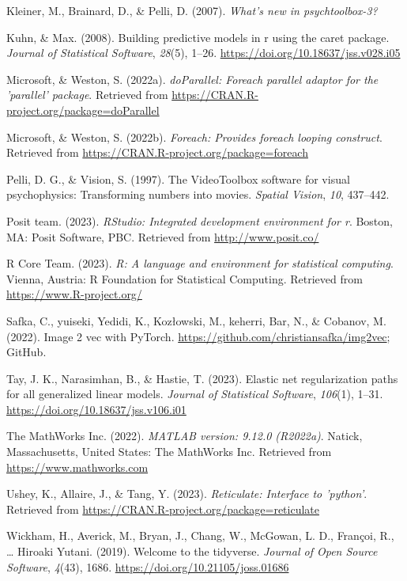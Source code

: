 \documentclass[
  man]{apa6}
\newlength{\cslhangindent}
\newlength{\cslentryspacingunit} %
\newenvironment{CSLReferences}[2] %
 {%
  \setlength{\parindent}{0pt}
  \ifodd #1
  \let\oldpar\par
  \def\par{\hangindent=\cslhangindent\oldpar}
  \fi
  \setlength{\parskip}{#2\cslentryspacingunit}
 }%
 {}
\begin{document}
\begin{CSLReferences}{1}{0}
\leavevmode{}%
Kleiner, M., Brainard, D., \& Pelli, D. (2007). \emph{What's new in psychtoolbox-3?}

\leavevmode{}%
Kuhn, \& Max. (2008). Building predictive models in r using the caret package. \emph{Journal of Statistical Software}, \emph{28}(5), 1--26. \url{https://doi.org/10.18637/jss.v028.i05}

\leavevmode{}%
Microsoft, \& Weston, S. (2022a). \emph{doParallel: Foreach parallel adaptor for the 'parallel' package}. Retrieved from \url{https://CRAN.R-project.org/package=doParallel}

\leavevmode{}%
Microsoft, \& Weston, S. (2022b). \emph{Foreach: Provides foreach looping construct}. Retrieved from \url{https://CRAN.R-project.org/package=foreach}

\leavevmode{}%
Pelli, D. G., \& Vision, S. (1997). The VideoToolbox software for visual psychophysics: Transforming numbers into movies. \emph{Spatial Vision}, \emph{10}, 437--442.

\leavevmode{}%
Posit team. (2023). \emph{RStudio: Integrated development environment for r}. Boston, MA: Posit Software, PBC. Retrieved from \url{http://www.posit.co/}

\leavevmode{}%
R Core Team. (2023). \emph{R: A language and environment for statistical computing}. Vienna, Austria: R Foundation for Statistical Computing. Retrieved from \url{https://www.R-project.org/}

\leavevmode{}%
Safka, C., yuiseki, Yedidi, K., Kozłowski, M., keherri, Bar, N., \& Cobanov, M. (2022). Image 2 vec with PyTorch. \url{https://github.com/christiansafka/img2vec}; GitHub.

\leavevmode{}%
Tay, J. K., Narasimhan, B., \& Hastie, T. (2023). Elastic net regularization paths for all generalized linear models. \emph{Journal of Statistical Software}, \emph{106}(1), 1--31. \url{https://doi.org/10.18637/jss.v106.i01}

\leavevmode{}%
The MathWorks Inc. (2022). \emph{MATLAB version: 9.12.0 (R2022a)}. Natick, Massachusetts, United States: The MathWorks Inc. Retrieved from \url{https://www.mathworks.com}

\leavevmode{}%
Ushey, K., Allaire, J., \& Tang, Y. (2023). \emph{Reticulate: Interface to 'python'}. Retrieved from \url{https://CRAN.R-project.org/package=reticulate}

\leavevmode{}%
Wickham, H., Averick, M., Bryan, J., Chang, W., McGowan, L. D., Françoi, R., \ldots{} Hiroaki Yutani. (2019). Welcome to the {tidyverse}. \emph{Journal of Open Source Software}, \emph{4}(43), 1686. \url{https://doi.org/10.21105/joss.01686}

\end{CSLReferences}
\end{document}
